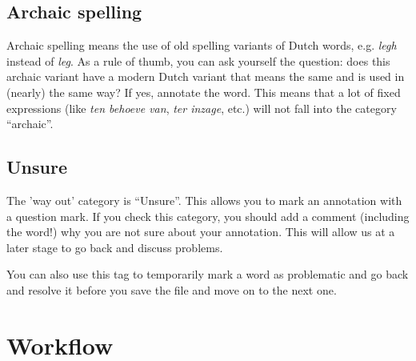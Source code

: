 \documentclass[a4paper,11pt]{article}
\begin{document}
\subsection{Archaic spelling}

Archaic spelling means the use of old spelling variants of Dutch
words, e.g.  \emph{legh} instead of \emph{leg}. As a rule of thumb,
you can ask yourself the question: does this archaic variant have a
modern Dutch variant that means the same and is used in (nearly) the
same way? If yes, annotate the word. This means that a lot of fixed
expressions (like \emph{ten behoeve van}, \emph{ter inzage}, etc.)
will not fall into the category ``archaic''.

\subsection{Unsure}

The 'way out' category is ``Unsure''. This allows you to
mark an annotation with a question mark. If you check this category,
you should add a comment (including the word!) why you are not sure
about your annotation.  This will allow us at a later stage to go back
and discuss problems.

You can also use this tag to temporarily mark a word as problematic
and go back and resolve it before you save the file and move on to the
next one.





\section{Workflow}
\end{document}
